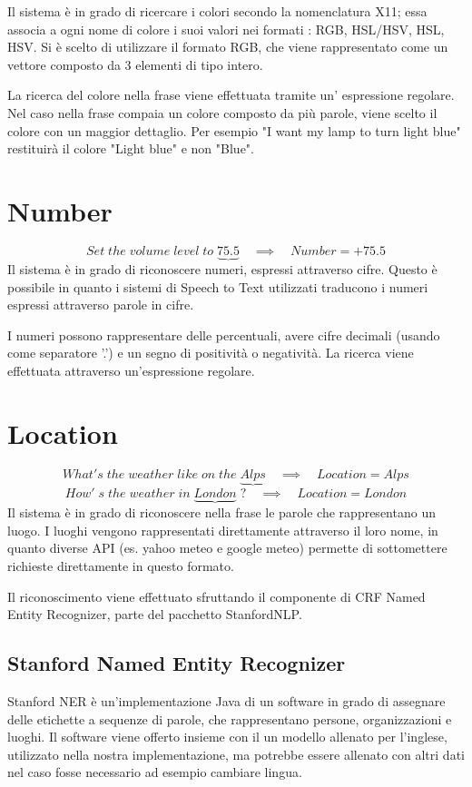 \documentclass[twoside]{supsistudent}
\begin{document}
Il sistema è in grado di ricercare i colori secondo la nomenclatura X11; essa associa a ogni nome di colore i suoi valori nei formati : RGB, HSL/HSV, HSL, HSV. Si è scelto di utilizzare il formato RGB, che viene rappresentato come un vettore composto da 3 elementi di tipo intero.\cite{x11Colors}

La ricerca del colore nella frase viene effettuata tramite un' espressione regolare. Nel caso nella frase compaia un colore composto da più parole, viene scelto il colore con un maggior dettaglio.
Per esempio "I want my lamp to turn light blue" restituirà il colore "Light blue" e non "Blue".
\section{Number}
\[
Set\;the\;volume\;level\;to\;
\underbrace{75.5}
\quad\implies\quad Number = +75.5
\]
Il sistema è in grado di riconoscere numeri, espressi attraverso cifre. Questo è possibile in quanto i sistemi di Speech to Text utilizzati traducono i numeri espressi attraverso parole in cifre.

I numeri possono rappresentare delle percentuali, avere cifre decimali (usando come separatore '.') e un segno di positività o negatività. La ricerca viene effettuata attraverso un'espressione regolare.
\section{Location}
\[
What's\;the\;weather\;like\;on\;the\;
\underbrace{Alps}
\quad\implies\quad Location = Alps
\]
\[
How'\;s\;the\;weather\;in\;
\underbrace{London}\;?
\quad\implies\quad Location = London
\]
Il sistema è in grado di riconoscere nella frase le parole che rappresentano un luogo.
I luoghi vengono rappresentati direttamente attraverso il loro nome, in quanto diverse API (es. yahoo meteo e google meteo) permette di sottomettere richieste direttamente in questo formato.

Il riconoscimento viene effettuato sfruttando il componente di CRF Named Entity Recognizer, parte del pacchetto StanfordNLP. \cite{stanfordNer}
\subsection{Stanford Named Entity Recognizer}
Stanford NER è un'implementazione Java di un software in grado di assegnare delle etichette a sequenze di parole, che rappresentano persone, organizzazioni e luoghi.
Il software viene offerto insieme con il un modello allenato per l'inglese, utilizzato nella nostra implementazione, ma potrebbe essere allenato con altri dati nel caso fosse necessario ad esempio cambiare lingua.
\end{document}
